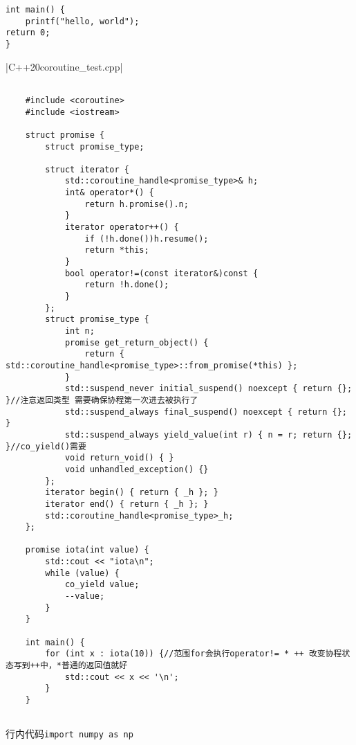 \documentclass{ctexart}
\begin{document}
\begin{verbatim}
int main() {
    printf("hello, world");
return 0;
}
\end{verbatim}

|C++20coroutine_test.cpp|
\begin{verbatim}
    
    #include <coroutine>
    #include <iostream>
    
    struct promise {
        struct promise_type;
    
        struct iterator {
            std::coroutine_handle<promise_type>& h;
            int& operator*() {
                return h.promise().n;
            }
            iterator operator++() {
                if (!h.done())h.resume();
                return *this;
            }
            bool operator!=(const iterator&)const {
                return !h.done();
            }
        };
        struct promise_type {
            int n;
            promise get_return_object() {
                return { std::coroutine_handle<promise_type>::from_promise(*this) };
            }
            std::suspend_never initial_suspend() noexcept { return {}; }//注意返回类型 需要确保协程第一次进去被执行了
            std::suspend_always final_suspend() noexcept { return {}; }
            std::suspend_always yield_value(int r) { n = r; return {}; }//co_yield()需要
            void return_void() { }
            void unhandled_exception() {}
        };
        iterator begin() { return { _h }; }
        iterator end() { return { _h }; }
        std::coroutine_handle<promise_type>_h;
    };
    
    promise iota(int value) {
        std::cout << "iota\n";
        while (value) {
            co_yield value;
            --value;
        }
    }
    
    int main() {
        for (int x : iota(10)) {//范围for会执行operator!= * ++ 改变协程状态写到++中，*普通的返回值就好 
            std::cout << x << '\n';
        }
    }
    
\end{verbatim}

行内代码\texttt{import numpy as np}
\end{document}
